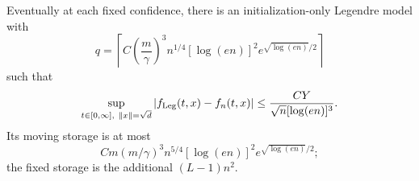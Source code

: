 \begin{proposition}
\label{cp:legendre}
Eventually at each fixed confidence, there is an initialization-only
Legendre model with
\begin{equation}
 q=\left\lceil C\left(\frac m\gamma\right)^3n^{1/4}
             [\log(en)]^2e^{\sqrt{\log(en)}/2}\right\rceil
 \label{cp:eq-legendre-order}
\end{equation}
such that
\begin{equation}
 \sup_{t\in[0,\infty],\ \|x\|=\sqrt d}
       |f_{\rm Leg}(t,x)-f_n(t,x)|
 \le\frac{CY}{\sqrt n[\log(en)]^3}.
 \label{cp:eq-legendre-accuracy}
\end{equation}
Its moving storage is at most
\[
 Cm(m/\gamma)^3n^{5/4}[\log(en)]^2e^{\sqrt{\log(en)}/2};
\]
the fixed storage is the additional $(L-1)n^2$.
\end{proposition}

